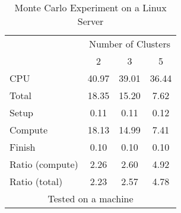 \documentclass[letterpaper, 14pt, titlepage]{article}
\begin{document}
\begin{landscape}
\begin{table}[!h]
\Large
\centering
\caption{\large Monte Carlo Experiment on a Linux Server}
\begin{tabular}{l*{3}{c}}\hline
& \multicolumn{3}{c}{Number of Clusters} \\
& 2 &               3 &               5 \\ \hline
CPU &    40.97 &     39.01 &     36.44 \\
Total &    18.35 &     15.20 &      7.62 \\
\hspace{2mm} Setup &     0.11 &      0.11 &      0.12 \\
\hspace{2mm} Compute &    18.13 &     14.99 &      7.41 \\
\hspace{2mm} Finish &     0.10 &      0.10 &      0.10 \\
\hline Ratio (compute) &     2.26 &      2.60 &      4.92 \\
Ratio (total) &     2.23 &      2.57 &      4.78 \\
\hline
\multicolumn{4}{c}{\footnotesize Tested on a \unix1 machine}
\end{tabular}
\end{table}

\pagebreak


\end{landscape}
\end{document}

